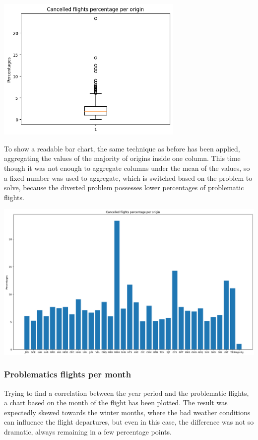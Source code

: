 \documentclass[
	letterpaper, %
	10pt, %
]{class}
\begin{document}
\begin{center}
    \includegraphics[width=9cm]{../images/cancelled_box_per_origin.png}
\end{center}

To show a readable bar chart, the same technique as before has been applied, aggregating the values of the majority of origins inside one column. This time though it was not enough to aggregate columns under the mean of the values, so a fixed number was used to aggregate, which is switched based on the problem to solve,
because the diverted problem possesses lower percentages of problematic flights.

\begin{center}
    \includegraphics[width=14cm]{../images/cancelled_per_origin.png}
\end{center}
\newpage

\subsubsection{Problematics flights per month}
Trying to find a correlation between the year period and the problematic flights, a chart based on the month of the flight has been plotted. The result was expectedly skewed towards the winter months, where the bad weather conditions can influence the flight departures, but even in this case, the difference was not so dramatic, always remaining in a few percentage points.
\end{document}
